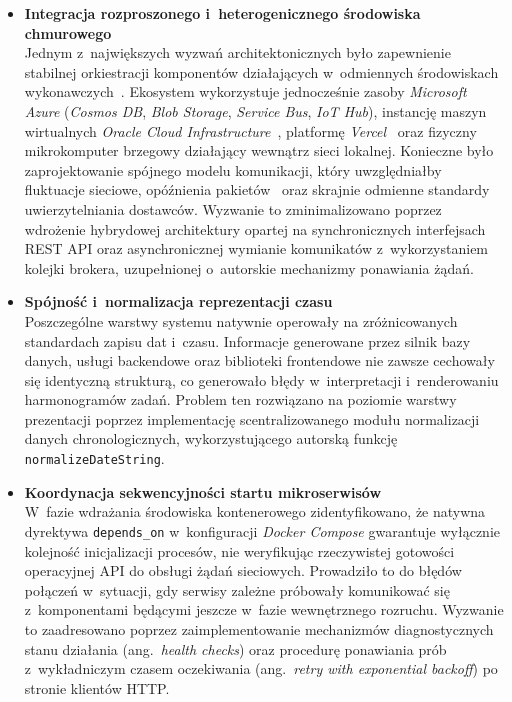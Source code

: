 \documentclass[a4paper,12pt,reqno]{article}
\begin{document}
\begin{itemize}
	\item \textbf{Integracja rozproszonego i~heterogenicznego środowiska chmurowego} \\
	Jednym z~największych wyzwań architektonicznych było zapewnienie stabilnej orkiestracji komponentów działających w~odmiennych środowiskach wykonawczych~\cite{newman2022}. Ekosystem wykorzystuje jednocześnie zasoby \textit{Microsoft Azure} (\textit{Cosmos DB}, \textit{Blob Storage}, \textit{Service Bus}, \textit{IoT Hub}), instancję maszyn wirtualnych \textit{Oracle Cloud Infrastructure}~\cite{oci}, platformę \textit{Vercel}~\cite{vercel} oraz fizyczny mikrokomputer brzegowy działający wewnątrz sieci lokalnej. Konieczne było zaprojektowanie spójnego modelu komunikacji, który uwzględniałby fluktuacje sieciowe, opóźnienia pakietów~\cite{kleppmann2017} oraz skrajnie odmienne standardy uwierzytelniania dostawców. Wyzwanie to zminimalizowano poprzez wdrożenie hybrydowej architektury opartej na synchronicznych interfejsach REST API oraz asynchronicznej wymianie komunikatów z~wykorzystaniem kolejki brokera, uzupełnionej o~autorskie mechanizmy ponawiania żądań.
	
	\item \textbf{Spójność i~normalizacja reprezentacji czasu} \\
	Poszczególne warstwy systemu natywnie operowały na zróżnicowanych standardach zapisu dat i~czasu. Informacje generowane przez silnik bazy danych, usługi backendowe oraz biblioteki frontendowe nie zawsze cechowały się identyczną strukturą, co generowało błędy w~interpretacji i~renderowaniu harmonogramów zadań. Problem ten rozwiązano na poziomie warstwy prezentacji poprzez implementację scentralizowanego modułu normalizacji danych chronologicznych, wykorzystującego autorską funkcję \texttt{normalizeDateString}.
	
	\item \textbf{Koordynacja sekwencyjności startu mikroserwisów} \\
	W~fazie wdrażania środowiska kontenerowego zidentyfikowano, że natywna dyrektywa \texttt{depends\_on} w~konfiguracji \textit{Docker Compose} gwarantuje wyłącznie kolejność inicjalizacji procesów, nie weryfikując rzeczywistej gotowości operacyjnej API do obsługi żądań sieciowych. Prowadziło to do błędów połączeń w~sytuacji, gdy serwisy zależne próbowały komunikować się z~komponentami będącymi jeszcze w~fazie wewnętrznego rozruchu. Wyzwanie to zaadresowano poprzez zaimplementowanie mechanizmów diagnostycznych stanu działania (ang.~\textit{health checks}) oraz procedurę ponawiania prób z~wykładniczym czasem oczekiwania (ang.~\textit{retry with exponential backoff}) po stronie klientów HTTP.
	

\end{itemize}
\end{document}
